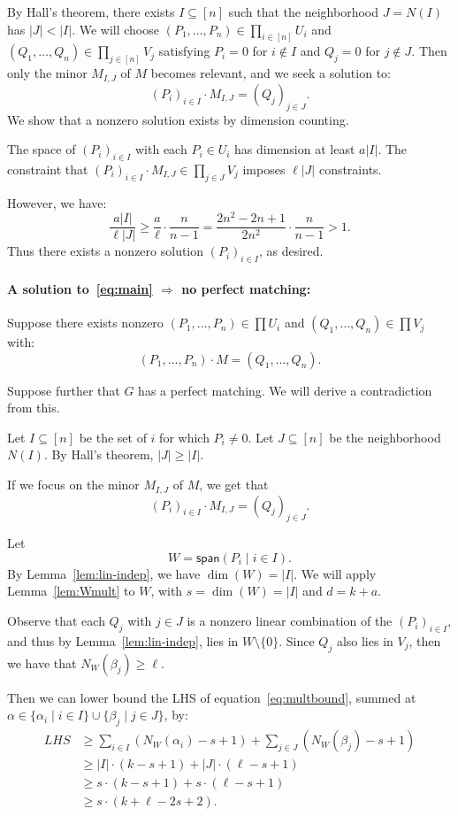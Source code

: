 \documentclass{article}
\begin{document}
By Hall's theorem, there exists $I \subseteq [n]$ 
such that the neighborhood $J = N(I)$ has $|J| < |I|$.
We will choose $(P_1, \ldots, P_n) \in \prod_{i \in [n]} U_i$  and $(Q_1, \ldots, Q_n) \in \prod_{j \in [n]}V_j$ satisfying $P_i = 0$ for $i \not\in I$ and $Q_j = 0$ for $j \not\in J$. Then only the minor $M_{I,J}$ of $M$ becomes relevant, and we seek a solution to:
$$(P_i)_{i \in I}  \cdot M_{I,J}  =  (Q_j)_{j \in J}.$$
We show that a nonzero solution exists by dimension counting.

The space of $(P_i)_{i \in I}$ with each $P_i \in U_i$ 
has dimension at least $a|I|$. The constraint that $(P_i)_{i \in I} \cdot M_{I,J} \in \prod_{j \in J} V_j$ imposes $\ell |J|$ constraints.

However, we have:
$$\frac{a |I|}{\ell |J|} \geq \frac{a}{\ell} \cdot \frac{n}{n-1} = \frac{2n^2 - 2n + 1}{2n^2} \cdot \frac{n}{n-1} > 1.$$
Thus there exists a nonzero solution $(P_i)_{i \in I}$, as desired.

\paragraph{A solution to~\eqref{eq:main} $\Rightarrow$ no perfect matching: }


Suppose there exists nonzero $(P_1, \ldots, P_n) \in \prod U_i$ and $(Q_1, \ldots, Q_n) \in \prod V_j$ 
with:
$$ (P_1, \ldots, P_n) \cdot M  = (Q_1, \ldots, Q_n).$$

Suppose further that $G$ has a perfect matching. 
We will derive a contradiction from this.

Let $I \subseteq [n]$ be the set of $i$ for which $P_i \neq 0$. Let $J \subseteq [n]$ be the neighborhood $N(I)$.
By Hall's theorem, $|J| \geq |I|$.

If we focus on the minor $M_{I,J}$ of $M$, we get that
$$(P_i)_{i \in I}  \cdot M_{I,J}  =  (Q_j)_{j \in J}.$$


Let
$$ W = \mathsf{span}( P_i  \mid i \in I ).$$
By Lemma~\ref{lem:lin-indep}, we have $\dim(W) = |I|$.
We will apply Lemma~\ref{lem:Wmult} to 
$W$, with $s = \dim(W) = |I|$ and $d = k + a$.

Observe that each $Q_j$ with $j \in J$ is a nonzero linear
combination of the $(P_i)_{i \in I}$, and thus by Lemma~\ref{lem:lin-indep}, lies in $W \setminus \{0\}$.
Since $Q_j$ also lies in $V_j$, then
we have that $N_W(\beta_j) \geq \ell$.

Then we can lower bound the LHS of equation~\eqref{eq:multbound},
summed at $\alpha \in \{ \alpha_i \mid i \in I\} \cup \{ \beta_j \mid j \in J \}$, by:
\begin{align*}
 LHS &\geq \sum_{i \in I} (N_W(\alpha_i) - s +1) + \sum_{j \in J}( N_W(\beta_j) - s + 1 )\\
 & \geq |I| \cdot (k - s + 1) + |J| \cdot (\ell - s + 1) \\
 & \geq s \cdot (k - s + 1) + s \cdot (\ell - s + 1) \\
 &\geq s \cdot (k + \ell - 2s + 2 ).
\end{align*}
\end{document}
